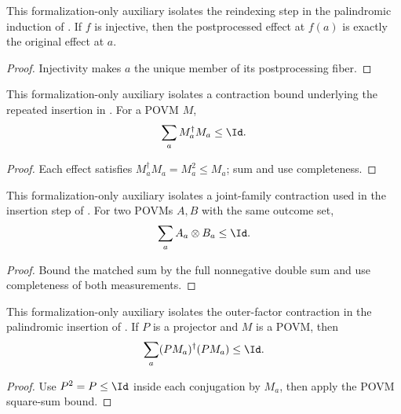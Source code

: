 \begin{lemma}
	\label{lem:sandwich-injective-postprocess}
	\leanok
	This formalization-only auxiliary isolates the reindexing step in the
	palindromic induction of \cite[Fact~4.34]{Natarajan2018NEEXP}. If $f$ is injective, then
	the postprocessed effect at $f(a)$ is exactly the original effect at $a$.
\end{lemma}
\begin{proof}
	\leanok
	Injectivity makes $a$ the unique member of its postprocessing fiber.
\end{proof}

\begin{lemma}
	\label{lem:sandwich-povm-square-sum}
	\leanok
	This formalization-only auxiliary isolates a contraction bound underlying
	the repeated insertion in \cite[Fact~4.34]{Natarajan2018NEEXP}. For a POVM $M$,
	\[
		\sum_a M_a^\dagger M_a\leq\Id.
	\]
\end{lemma}
\begin{proof}
	\leanok
	Each effect satisfies $M_a^\dagger M_a=M_a^2\leq M_a$; sum and use
	completeness.
\end{proof}

\begin{lemma}
	\label{lem:sandwich-matched-tensor-sum}
	\leanok
	This formalization-only auxiliary isolates a joint-family contraction used in
	the insertion step of \cite[Fact~4.34]{Natarajan2018NEEXP}. For two POVMs $A,B$ with the
	same outcome set,
	\[
		\sum_a A_a\otimes B_a\leq\Id.
	\]
\end{lemma}
\begin{proof}
	\leanok
	Bound the matched sum by the full nonnegative double sum and use completeness
	of both measurements.
\end{proof}

\begin{lemma}
	\label{lem:sandwich-projective-multiplier-sum}
	\leanok
	This formalization-only auxiliary isolates the outer-factor contraction in
	the palindromic insertion of \cite[Fact~4.34]{Natarajan2018NEEXP}. If $P$ is a projector
	and $M$ is a POVM, then
	\[
		\sum_a(PM_a)^\dagger(PM_a)\leq\Id.
	\]
\end{lemma}
\begin{proof}
	\leanok
	Use $P^2=P\leq\Id$ inside each conjugation by $M_a$, then apply the POVM
	square-sum bound.
\end{proof}

